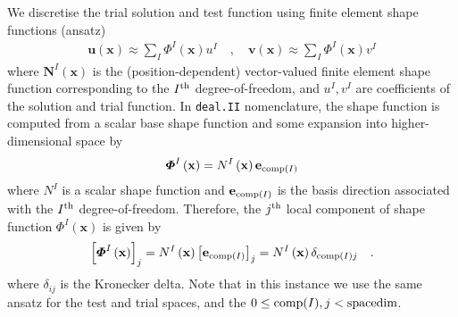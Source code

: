 \documentclass[]{scrartcl}
\begin{document}
We discretise the trial solution and test function using finite element shape functions (ansatz)
\begin{gather}
\mathbf{u} \left( \mathbf{x} \right)
  \approx \sum\limits_{I} \boldsymbol{\varPhi}^{I} \left( \mathbf{x} \right) u^{I}
\quad , \quad
\mathbf{v} \left( \mathbf{x} \right)
  \approx \sum\limits_{I} \boldsymbol{\varPhi}^{I} \left( \mathbf{x} \right) v^{I}
\end{gather}
where $\mathbf{N}^{I} \left( \mathbf{x} \right)$ is the (position-dependent) vector-valued finite element shape function corresponding to the $I^{\textnormal{th}}$ degree-of-freedom, and $u^{I}, v^{I}$ are coefficients of the solution and trial function.
In \texttt{deal.II} nomenclature, the shape function is computed from a scalar base shape function and some expansion into higher-dimensional space by
\begin{gather}
\boldsymbol{\varPhi}^{I} \left( \mathbf{x} \right) 
  = N^{I} \left( \mathbf{x} \right) \mathbf{e}_{\textnormal{comp}(I)}
\end{gather}
where $N^{I}$ is a scalar shape function and $\mathbf{e}_{\textnormal{comp}(I)}$ is the basis direction associated with the $I^{\textnormal{th}}$ degree-of-freedom.
Therefore, the $j^{\textnormal{th}}$ local component of shape function $\boldsymbol{\varPhi}^{I} \left( \mathbf{x} \right)$ is given by
\begin{gather}
\left[\boldsymbol{\varPhi}^{I} \left( \mathbf{x} \right)\right]_{j}
  = N^{I} \left( \mathbf{x} \right) \left[ \mathbf{e}_{\textnormal{comp}(I)} \right]_{j}
  = N^{I} \left( \mathbf{x} \right) \delta_{\textnormal{comp}(I) j}
\quad .
\end{gather}
where $\delta_{ij}$ is the Kronecker delta. 
Note that in this instance we use the same ansatz for the test and trial spaces, and the $0 \leq \textnormal{comp}(I), j < \textnormal{spacedim}$.
\end{document}
